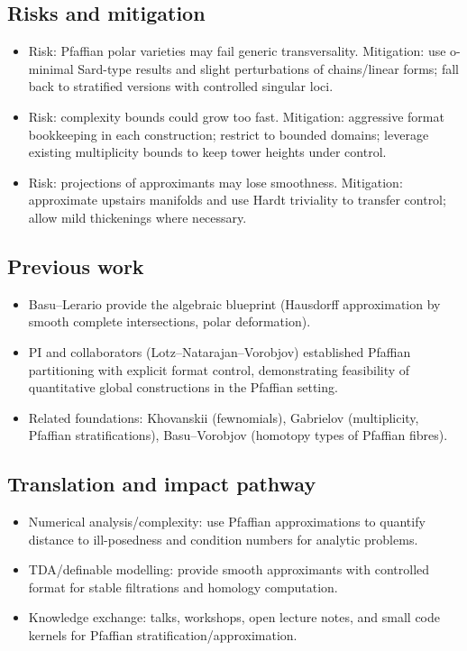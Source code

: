 \documentclass[11pt,a4paper]{article}
\begin{document}
\subsection*{Risks and mitigation}
\begin{itemize}
  \item Risk: Pfaffian polar varieties may fail generic transversality. Mitigation: use o-minimal Sard-type results and slight perturbations of chains/linear forms; fall back to stratified versions with controlled singular loci.
  \item Risk: complexity bounds could grow too fast. Mitigation: aggressive format bookkeeping in each construction; restrict to bounded domains; leverage existing multiplicity bounds to keep tower heights under control.
  \item Risk: projections of approximants may lose smoothness. Mitigation: approximate upstairs manifolds and use Hardt triviality to transfer control; allow mild thickenings where necessary.
\end{itemize}

\subsection*{Previous work}
\begin{itemize}
  \item Basu--Lerario provide the algebraic blueprint (Hausdorff approximation by smooth complete intersections, polar deformation).
  \item PI and collaborators (Lotz--Natarajan--Vorobjov) established Pfaffian partitioning with explicit format control, demonstrating feasibility of quantitative global constructions in the Pfaffian setting.
  \item Related foundations: Khovanskii (fewnomials), Gabrielov (multiplicity, Pfaffian stratifications), Basu--Vorobjov (homotopy types of Pfaffian fibres).
\end{itemize}

\subsection*{Translation and impact pathway}
\begin{itemize}
  \item Numerical analysis/complexity: use Pfaffian approximations to quantify distance to ill-posedness and condition numbers for analytic problems.
  \item TDA/definable modelling: provide smooth approximants with controlled format for stable filtrations and homology computation.
  \item Knowledge exchange: talks, workshops, open lecture notes, and small code kernels for Pfaffian stratification/approximation.
\end{itemize}
\end{document}
